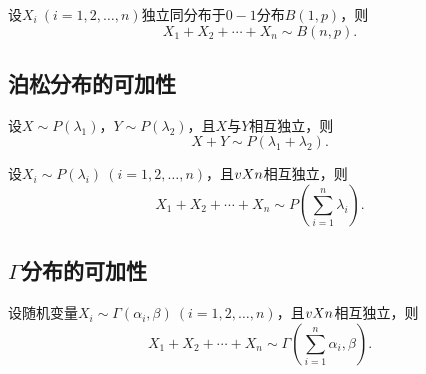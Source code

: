 \begin{corollary}\label{theorem:多维随机变量及其分布.二项分布的可加性3}
设\(X_i\ (i=1,2,\dotsc,n)\)独立同分布于\(0-1\)分布\(B(1,p)\)，则\[
X_1+X_2+\dotsb+X_n \sim B(n,p).
\]
\end{corollary}

\subsection{泊松分布的可加性}
\begin{theorem}\label{theorem:多维随机变量及其分布.泊松分布的可加性1}
设\(X \sim P(\lambda_1)\)，\(Y \sim P(\lambda_2)\)，且\(X\)与\(Y\)相互独立，则\[
X+Y \sim P(\lambda_1 + \lambda_2).
\]
\end{theorem}

\begin{corollary}\label{theorem:多维随机变量及其分布.泊松分布的可加性2}
设\(X_i \sim P(\lambda_i)\ (i=1,2,\dotsc,n)\)，且\(v{X}{n}\)相互独立，则\[
X_1+X_2+\dotsb+X_n \sim P\left(\sum\limits_{i=1}^n{\lambda_i}\right).
\]
\end{corollary}

\subsection{\texorpdfstring{\(\Gamma\)分布的可加性}{伽马分布的可加性}}
\begin{theorem}\label{theorem:多维随机变量及其分布.伽马分布的可加性1}
设随机变量\(X_i \sim \Gamma(\alpha_i,\beta)\ (i=1,2,\dotsc,n)\)，且\(v{X}{n}\)相互独立，则\[
X_1+X_2+\dotsb+X_n \sim \Gamma\left(\sum\limits_{i=1}^n{\alpha_i},\beta\right).
\]
\end{theorem}

